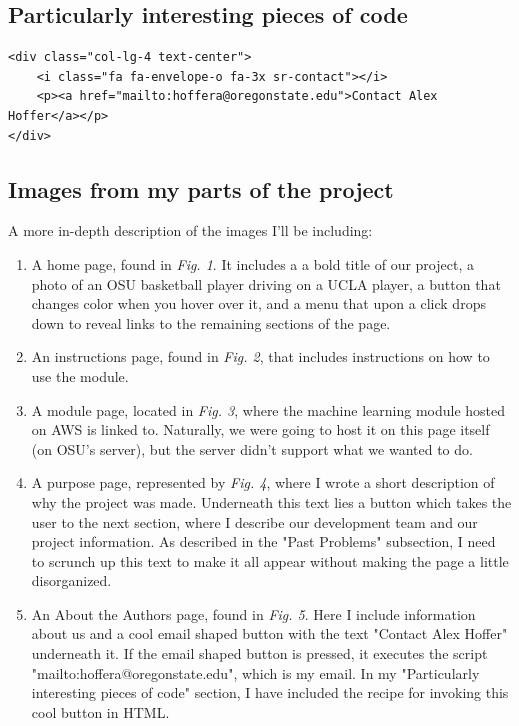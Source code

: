 \documentclass[onecolumn, draftclsnofoot,10pt, compsoc]{IEEEtran}
\begin{document}
\subsection{Particularly interesting pieces of code}
\begin{lstlisting}[caption=HTML code that uses an icon class to load an envelope icon that links to my email, label=list1]
<div class="col-lg-4 text-center">
	<i class="fa fa-envelope-o fa-3x sr-contact"></i>
	<p><a href="mailto:hoffera@oregonstate.edu">Contact Alex Hoffer</a></p>
</div>
\end{lstlisting}

\subsection{Images from my parts of the project}
A more in-depth description of the images I'll be including:

\begin{enumerate}
\item A home page, found in \textit{Fig. 1}. It includes a a bold title of our project, a photo of an OSU basketball player driving on a UCLA player, a button that changes color when you hover over it, and a menu that upon a click drops down to reveal links to the remaining sections of the page.
\item An instructions page, found in \textit{Fig. 2}, that includes instructions on how to use the module.
\item A module page, located in \textit{Fig. 3}, where the machine learning module hosted on AWS is linked to. Naturally, we were going to host it on this page itself (on OSU's server), but the server didn't support what we wanted to do.
\item A purpose page, represented by \textit{Fig. 4}, where I wrote a short description of why the project was made. Underneath this text lies a button which takes the user to the next section, where I describe our development team and our project information. As described in the "Past Problems" subsection, I need to scrunch up this text to make it all appear without making the page a little disorganized. 
\item An About the Authors page, found in \textit{Fig. 5}. Here I include information about us and a cool email shaped button with the text "Contact Alex Hoffer" underneath it. If the email shaped button is pressed, it executes the script "mailto:hoffera@oregonstate.edu", which is my email. In my "Particularly interesting pieces of code" section, I have included the recipe for invoking this cool button in HTML.
\end{enumerate}  
\newpage
\end{document}
